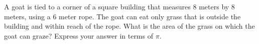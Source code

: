 A goat is tied to a corner of a square building that measures $8$ meters by $8$ meters, using a $6$ meter rope. The goat can eat only grass that is outside the building and within reach of the rope. What is the area of the grass on which the goat can graze? Express your answer in terms of $\pi$.
